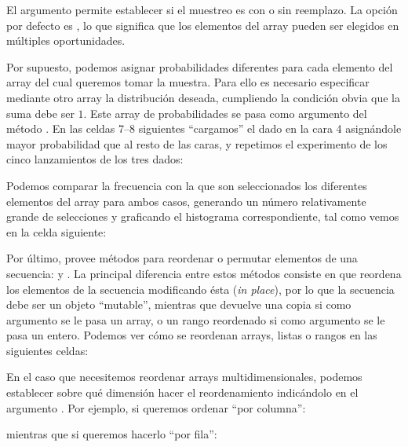 
El argumento  permite establecer si el muestreo es con o sin reemplazo. La opción por defecto es , lo que significa que los elementos del array  pueden ser elegidos en múltiples oportunidades.

Por supuesto, podemos asignar probabilidades diferentes para cada elemento del array del cual queremos tomar la muestra. Para ello es necesario especificar mediante otro array la distribución deseada, cumpliendo la condición obvia que la suma debe ser $1$. Este array de probabilidades se pasa como argumento  del método . En las celdas 7--8 siguientes ``cargamos'' el dado en la cara 4 asignándole mayor probabilidad que al resto de las caras, y repetimos el experimento de los cinco lanzamientos de los tres dados:


Podemos comparar la frecuencia con la que son seleccionados los diferentes elementos del array  para ambos casos, generando un número relativamente grande de selecciones y graficando el histograma correspondiente, tal como vemos en la celda siguiente:


Por último,  provee métodos para reordenar o permutar elementos de una secuencia:  y . La principal diferencia entre estos métodos consiste en que  reordena los elementos de la secuencia modificando ésta (\textit{in place}), por lo que la secuencia debe ser un objeto ``mutable'', mientras que  devuelve una copia si como argumento se le pasa un array, o un rango reordenado si como argumento se le pasa un entero.  Podemos ver cómo se reordenan arrays, listas o rangos en las siguientes celdas:


En el caso que necesitemos reordenar arrays multidimensionales, podemos establecer sobre qué dimensión hacer el reordenamiento indicándolo en el argumento . Por ejemplo, si queremos ordenar ``por columna'':



mientras que si queremos hacerlo ``por fila'':

